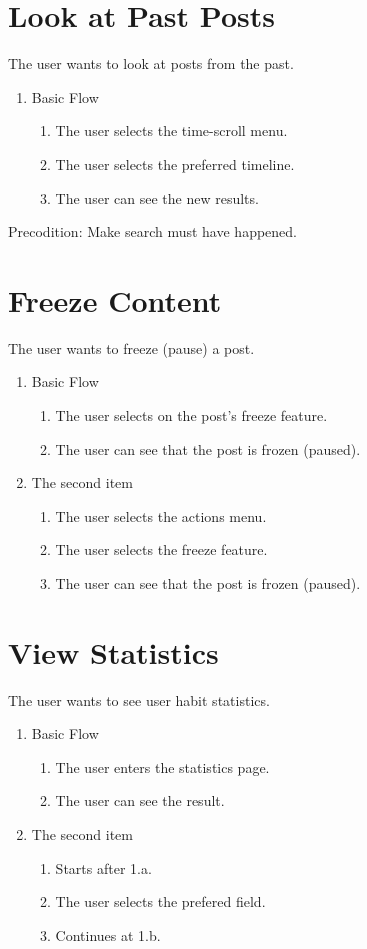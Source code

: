 \section{Look at Past Posts}
The user wants to look at posts from the past.
\begin{enumerate}
\item Basic Flow
  \begin{enumerate}
    \item The user selects the time-scroll menu.
    \item The user selects the preferred timeline.
    \item The user can see the new results.
  \end{enumerate}
\end{enumerate}
Precodition: \newline
Make search must have happened.

\section{Freeze Content}
The user wants to freeze (pause) a post.
\begin{enumerate}
  \item Basic Flow
  \begin{enumerate}
    \item The user selects on the post's freeze feature.
    \item The user can see that the post is frozen (paused).
  \end{enumerate}
  \item The second item
  \begin{enumerate}
    \item The user selects the actions menu.
    \item The user selects the freeze feature.
    \item The user can see that the post is frozen (paused).
  \end{enumerate}
\end{enumerate}

\section{View Statistics}
The user wants to see user habit statistics.
\begin{enumerate}
  \item Basic Flow
  \begin{enumerate}
    \item The user enters the statistics page.
    \item The user can see the result.
  \end{enumerate}
  \item The second item
  \begin{enumerate}
    \item Starts after 1.a.
    \item The user selects the prefered field.
    \item Continues at 1.b.
  \end{enumerate}
\end{enumerate}

